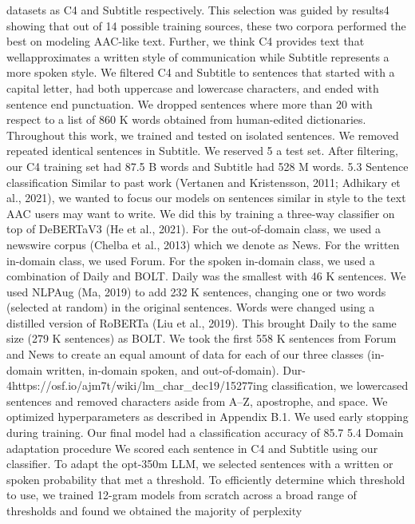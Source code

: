 datasets as C4 and Subtitle respectively. This selection was guided by results4 showing that out
of 14 possible training sources, these two corpora performed the best on modeling AAC-like
text. Further, we think C4 provides text that wellapproximates a written style of communication
while Subtitle represents a more spoken style.
We filtered C4 and Subtitle to sentences that
started with a capital letter, had both uppercase and
lowercase characters, and ended with sentence end
punctuation. We dropped sentences where more
than 20%
with respect to a list of 860 K words obtained from
human-edited dictionaries. Throughout this work,
we trained and tested on isolated sentences. We
removed repeated identical sentences in Subtitle.
We reserved 5%
a test set. After filtering, our C4 training set had
87.5 B words and Subtitle had 528 M words.
5.3 Sentence classification
Similar to past work (Vertanen and Kristensson,
2011; Adhikary et al., 2021), we wanted to focus
our models on sentences similar in style to the text
AAC users may want to write. We did this by training a three-way classifier on top of DeBERTaV3
(He et al., 2021). For the out-of-domain class, we
used a newswire corpus (Chelba et al., 2013) which
we denote as News. For the written in-domain class,
we used Forum. For the spoken in-domain class,
we used a combination of Daily and BOLT.
Daily was the smallest with 46 K sentences. We
used NLPAug (Ma, 2019) to add 232 K sentences,
changing one or two words (selected at random) in
the original sentences. Words were changed using
a distilled version of RoBERTa (Liu et al., 2019).
This brought Daily to the same size (279 K sentences) as BOLT. We took the first 558 K sentences
from Forum and News to create an equal amount of
data for each of our three classes (in-domain written, in-domain spoken, and out-of-domain). Dur-
4https://osf.io/ajm7t/wiki/lm_char_dec19/15277ing classification, we lowercased sentences and
removed characters aside from A–Z, apostrophe,
and space. We optimized hyperparameters as described in Appendix B.1. We used early stopping
during training. Our final model had a classification
accuracy of 85.7%
5.4 Domain adaptation procedure
We scored each sentence in C4 and Subtitle using
our classifier. To adapt the opt-350m LLM, we
selected sentences with a written or spoken probability that met a threshold. To efficiently determine
which threshold to use, we trained 12-gram models
from scratch across a broad range of thresholds
and found we obtained the majority of perplexity
